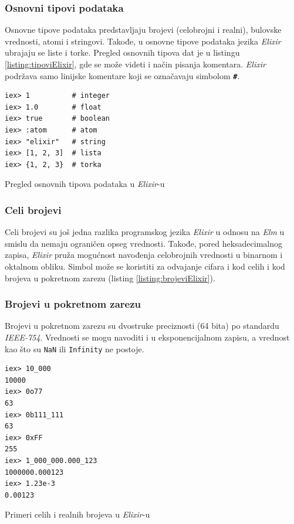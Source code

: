 \documentclass[12pt,oneside]{memoir}
\begin{document}
\subsubsection{Osnovni tipovi podataka}
Osnovne tipove podataka predstavljaju brojevi (celobrojni i realni), bulovske
vrednosti, atomi i stringovi. Takođe, u osnovne tipove podataka jezika \emph{Elixir} ubrajaju se liste i torke. Pregled
osnovnih tipova dat je u listingu \ref{listing:tipoviElixir}, gde se može videti i način pisanja
komentara. \emph{Elixir} podržava samo linijske komentare koji se označavaju simbolom \texttt{\textbf{\#}}.
\begin{listing}[!h]
\begin{verbatim}
iex> 1          # integer
iex> 1.0        # float
iex> true       # boolean 
iex> :atom      # atom
iex> "elixir"   # string
iex> [1, 2, 3]  # lista
iex> {1, 2, 3}  # torka
\end{verbatim}
\caption{Pregled osnovnih tipova podataka u \emph{Elixir}-u}
\label{listing:tipoviElixir}
\end{listing}

\subsubsection{Celi brojevi}
Celi brojevi su još jedna razlika programskog jezika \emph{Elixir} u odnosu na \emph{Elm}
u smislu da nemaju ograničen opseg vrednosti. Takođe, pored
heksadecimalnog zapisa, \emph{Elixir} pruža mogućnost navođenja celobrojnih vrednosti u binarnom i 
oktalnom obliku. Simbol \texttt{\textbf{\textunderscore}} može se koristiti za odvajanje 
cifara i kod celih i kod brojeva u pokretnom zarezu (listing \ref{listing:brojeviElixir}).
\subsubsection{Brojevi u pokretnom zarezu}
Brojevi u pokretnom zarezu su dvostruke preciznosti (64 bita) po standardu \emph{IEEE-754}.
Vrednosti se mogu navoditi i u eksponencijalnom zapisu, a vrednost kao što su \texttt{NaN}
ili \texttt{Infinity} ne postoje.
\begin{listing}[!h]
\begin{verbatim}
iex> 10_000
10000
iex> 0o77
63
iex> 0b111_111
63
iex> 0xFF
255
iex> 1_000_000.000_123
1000000.000123
iex> 1.23e-3
0.00123
\end{verbatim}
\caption{Primeri celih i realnih brojeva u \emph{Elixir}-u}
\label{listing:brojeviElixir}
\end{listing}
\end{document}
